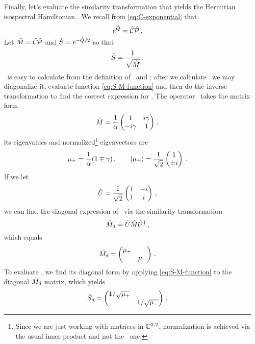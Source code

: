         Finally, let's evaluate the similarity transformation that yields the Hermitian isospectral Hamiltonian \hF. We recall from \eqref{eq:C-exponential} that
        \begin{equation*}
            e^{\hat{Q}} = \mathcal{\hat{C}}\mathcal{\hat{P}}
            \,\text{.}
        \end{equation*}
        Let $\hat{M} = \mathcal{\hat{C}}\mathcal{\hat{P}}$ and $\hat{S} = e^{-\hat{Q}/2}$ so that
        \begin{equation}
            \label{eq:S-M-function}
            \hat{S} = \frac{1}{\sqrt{\hat{M}}}
            \,\text{.}
        \end{equation}
        \hM\ is easy to calculate from the definition of \hC\ and \hP; after we calculate \hM\ we may diagonalize it, evaluate function \eqref{eq:S-M-function} and then do the inverse transformation to find the correct expression for \hS. The operator \hM\ takes the matrix form
        \begin{equation*}
            \hM = \frac{1}{\alpha}\pmqty{\admat[1]{i\gamma, -i\gamma}}
            \mycomma
        \end{equation*}
        its eigenvalues and normalized\footnote{Since we are just working with matrices in $\mathbb{C}^{2,2}$, normalization is achieved via the usual inner product and not the \PT\ one.} eigenvectors are
        \begin{equation*}
            \mu_{\pm} = \frac{1}{\alpha}\pqty{1 \mp \gamma}
            \mycomma
            \qquad
            \ket{\mu_\pm} = \frac{1}{\sqrt{2}}\pmqty{1 \\ \pm i}
            \myperiod
        \end{equation*}
        If we let
        \begin{equation*}
            \hU = \frac{1}{\sqrt{2}}\pmqty{1 & -i \\ 1 & i}
            \mycomma
        \end{equation*}
        we can find the diagonal expression of \hM\ via the similarity transformation
        \begin{equation}
            \hat{M}_d = \hat{U} \hat{M} \hat{U}^\dag
            \,\text{,}
        \end{equation}
        which equals
        \begin{equation*}
            \hM_d = \pmqty{\dmat{\mu_{+}, \mu_{-}}}
            \myperiod
        \end{equation*}
        To evaluate \hS, we find its diagonal form by applying \eqref{eq:S-M-function} to the diagonal $\hat{M}_d$ matrix, which yields
        \begin{equation*}
            \hS_d = \pmqty{\dmat{1/\sqrt{\mu_{+}}, 1/\sqrt{\mu_{-}}}}
            \mycomma
        \end{equation*}
